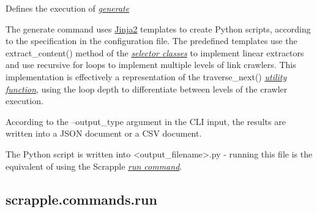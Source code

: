\documentclass[letterpaper,12pt,english]{sphinxmanual}
\begin{document}
\begin{fulllineitems}
\label{implementation/commands:scrapple.commands.generate.GenerateCommand}
Defines the execution of {\hyperref[framework/commands:command-generate]{\emph{generate}}}

\begin{fulllineitems}
\label{implementation/commands:scrapple.commands.generate.GenerateCommand.execute_command}
The generate command uses \href{http://jinja.pocoo.org/}{Jinja2} templates         to create Python scripts, according to the specification in the configuration         file. The predefined templates use the extract\_content() method of the         {\hyperref[implementation/selectors:implementation-selectors]{\emph{selector classes}}} to implement linear extractors         and use recursive for loops to implement multiple levels of link crawlers. This         implementation is effectively a representation of the traverse\_next()         {\hyperref[implementation/utils:implementation-utils]{\emph{utility function}}}, using the loop depth to         differentiate between levels of the crawler execution.

According to the --output\_type argument in the CLI input, the results are         written into a JSON document or a CSV document.

The Python script is written into \textless{}output\_filename\textgreater{}.py - running this file         is the equivalent of using the Scrapple {\hyperref[framework/commands:command-run]{\emph{run command}}}.

\end{fulllineitems}


\end{fulllineitems}

\label{implementation/commands:module-scrapple.commands.run}

\subsection{scrapple.commands.run}
\label{implementation/commands:scrapple-commands-run}
\end{document}
